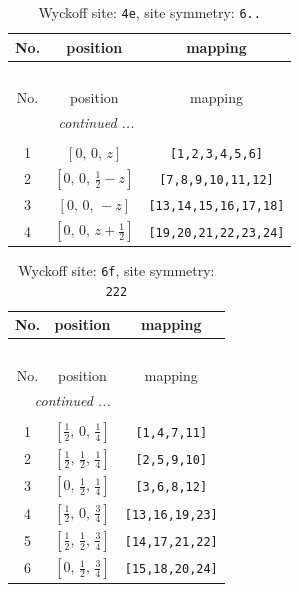 \documentclass[fleqn,8pt]{jsarticle}
\begin{document}
\renewcommand{\arraystretch}{1.2}
\begin{longtable}{ccc}
\caption{Wyckoff site: {\tt 4e}, site symmetry: {\tt 6..}}
 \\
 \hline \hline
No. & position & mapping \\ \hline \endfirsthead

\multicolumn{2}{l}{\tablename\ \thetable{}} \\
 \hline \hline
No. & position & mapping \\ \hline \endhead

 \hline \hline
\multicolumn{2}{r}{\footnotesize\it continued ...} \\ \endfoot

 \hline \hline
\multicolumn{2}{r}{} \\ \endlastfoot

1 & $\left[ 0,\, 0,\, z \right]$ & {\tt [1,2,3,4,5,6]} \\ \hline
2 & $\left[ 0,\, 0,\, \frac{1}{2} - z \right]$ & {\tt [7,8,9,10,11,12]} \\ \hline
3 & $\left[ 0,\, 0,\, - z \right]$ & {\tt [13,14,15,16,17,18]} \\ \hline
4 & $\left[ 0,\, 0,\, z + \frac{1}{2} \right]$ & {\tt [19,20,21,22,23,24]} \\
\end{longtable}
\renewcommand{\arraystretch}{1.2}
\begin{longtable}{ccc}
\caption{Wyckoff site: {\tt 6f}, site symmetry: {\tt 222}}
 \\
 \hline \hline
No. & position & mapping \\ \hline \endfirsthead

\multicolumn{2}{l}{\tablename\ \thetable{}} \\
 \hline \hline
No. & position & mapping \\ \hline \endhead

 \hline \hline
\multicolumn{2}{r}{\footnotesize\it continued ...} \\ \endfoot

 \hline \hline
\multicolumn{2}{r}{} \\ \endlastfoot

1 & $\left[ \frac{1}{2},\, 0,\, \frac{1}{4} \right]$ & {\tt [1,4,7,11]} \\ \hline
2 & $\left[ \frac{1}{2},\, \frac{1}{2},\, \frac{1}{4} \right]$ & {\tt [2,5,9,10]} \\ \hline
3 & $\left[ 0,\, \frac{1}{2},\, \frac{1}{4} \right]$ & {\tt [3,6,8,12]} \\ \hline
4 & $\left[ \frac{1}{2},\, 0,\, \frac{3}{4} \right]$ & {\tt [13,16,19,23]} \\ \hline
5 & $\left[ \frac{1}{2},\, \frac{1}{2},\, \frac{3}{4} \right]$ & {\tt [14,17,21,22]} \\ \hline
6 & $\left[ 0,\, \frac{1}{2},\, \frac{3}{4} \right]$ & {\tt [15,18,20,24]} \\
\end{longtable}
\end{document}
